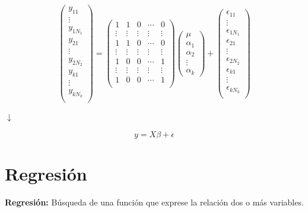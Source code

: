 \documentclass[10pt,a4paper]{book}
\begin{document}
$$ \left( \begin{array}{c}
y_{11}\\
\vdots\\
y_{1N_1}\\
\hline
y_{21}\\
\vdots\\
y_{2N_2}\\
\hline
y_{k1}\\
\vdots\\
y_{kN_k}\\
\end{array} \right) =  
\left( \begin{array}{ccccc}
1 & 1 & 0 & \cdots & 0\\
\vdots & \vdots & \vdots & \vdots & \vdots\\
1 & 1 & 0 & \cdots & 0\\
\hline
\vdots & \vdots & \vdots & \vdots & \vdots\\
\hline
1 & 0 & 0 & \cdots & 1\\
\vdots & \vdots & \vdots & \vdots & \vdots\\
1 & 0 & 0 & \cdots & 1\\
\end{array} \right)
\left( \begin{array}{c}
\mu\\
\alpha_1\\
\alpha_2\\
\vdots\\
\alpha_k \end{array} \right) + 
\left( \begin{array}{c}
\epsilon_{11}\\
\vdots\\
\epsilon_{1N_1}\\
\hline
\epsilon_{21}\\
\vdots\\
\epsilon_{2N_2}\\
\hline
\epsilon_{k1}\\
\vdots\\
\epsilon_{kN_k}\\
\end{array} \right)$$
\begin{center}
$ \downarrow $
\end{center}
$$y=X\beta+\epsilon$$
	\section{Regresión}
\textbf{Regresión:} Búsqueda de una función que exprese la relación dos o más variables.
\ \\
\end{document}
